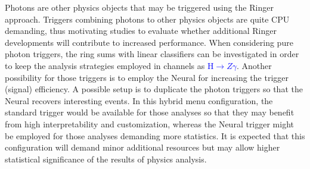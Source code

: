 
Photons are other physics objects that may be triggered using the Ringer approach. Triggers combining photons to other physics objects are quite CPU demanding, thus motivating studies to evaluate whether additional Ringer developments will contribute to increased performance.
When considering pure
photon triggers, the ring sums with linear classifiers can
be investigated in order to keep the analysis strategies employed in channels as
\textcolor{blue}{$\text{H}\rightarrow Z\gamma$}. Another possibility for those triggers is to
employ the Neural\rnn{} for increasing the trigger (signal) efficiency. A possible
setup is to duplicate the photon triggers so that the Neural\rnn{} recovers
interesting events.  In this hybrid menu configuration, the standard trigger
would be available for those analyses so that they may benefit from high
interpretability and customization, whereas the Neural\rnn{} trigger might be employed
for those analyses demanding more statistics. It is expected that this
configuration will demand minor additional resources but may allow higher
statistical significance of the results of physics analysis.





